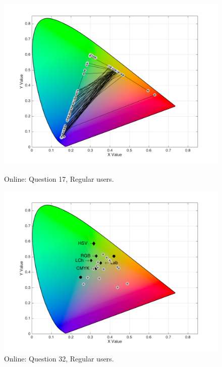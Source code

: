 %
\begin{figure}[!htbp]
  \centering
  \vspace{-5pt}
  \begin{minipage}{0.4\textwidth}
    \centering
    \includegraphics[width=\textwidth]{images/results/17_online_regularUsers.png}
    \caption[Online: Answers for Question 17, from regular users.]{Online: Question 17, Regular users.}
    \label{fig:greenblend_1}
  \end{minipage}
  \begin{minipage}{0.4\textwidth}
    \centering
    \includegraphics[width=\textwidth]{images/results/32_online_regularUsers.png}
    \caption[Online: Answers for Question 32, from regular users.]{Online: Question 32, Regular users.}
    \label{fig:greenblend_2}
  \end{minipage}
  \vspace{-5pt}
\end{figure}
%
